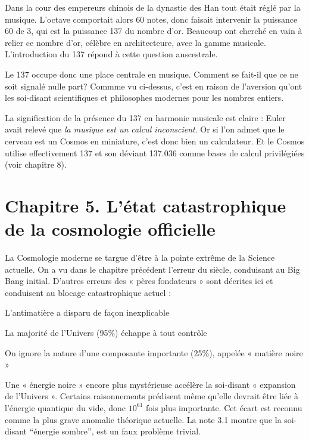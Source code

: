 \documentclass[a4paper,12pt]{article}
\begin{document}
Dans la cour des empereurs chinois de la dynastie des Han tout était réglé par la musique. L'octave comportait alors 60 notes, donc faisait intervenir la puissance 60 de 3, qui est la puissance 137 du nombre d'or. Beaucoup ont cherché en vain à relier ce nombre d'or, célèbre en architecteure, avec la gamme musicale. L'introduction du 137 répond à cette question anscestrale.


Le 137 occupe donc une place centrale en musique. Comment se fait-il que ce ne soit signalé nulle part? Commme vu ci-dessus, c'est en raison de l'aversion qu'ont les soi-disant scientifiques et philosophes modernes pour les nombres entiers. 


La signification de la présence du 137 en harmonie musicale est claire : Euler avait relevé que \textit{la musique est un calcul inconscient}. Or si l'on admet que le cerveau est un Cosmos en miniature, c'est donc bien un calculateur. Et le Cosmos utilise effectivement 137 et son déviant 137.036 comme bases de calcul privilégiées (voir chapitre 8).
   











\section{Chapitre 5. L'état catastrophique de la cosmologie officielle}

La Cosmologie moderne se targue d'être à la pointe extr\^eme de la Science actuelle. On a vu dans le chapitre précédent l’erreur du siècle, conduisant au Big Bang initial. D’autres erreurs des « pères fondateurs » sont décrites ici  et conduisent au blocage catastrophique actuel :

L'antimatière a disparu de façon inexplicable

La majorité de l’Univers (95\%) échappe à tout contrôle

On ignore la nature d’une composante importante (25\%), appelée « matière noire »

Une « énergie noire »  encore plus mystérieuse accélère la soi-disant « expansion de l’Univers ». Certains raisonnements prédisent  même qu’elle devrait être liée à l’énergie quantique du vide, donc $10^{61}$ fois plus importante. Cet écart est reconnu comme la plus grave anomalie théorique actuelle.
La note 3.1 montre que la soi-disant ``énergie sombre'', est un faux problème trivial. 
\end{document}

